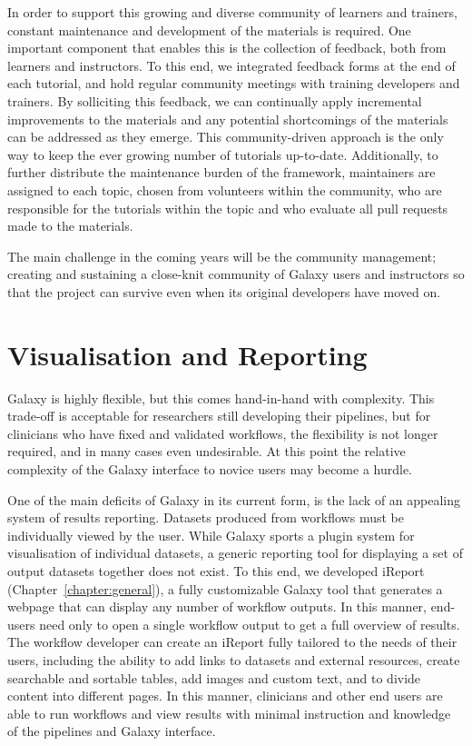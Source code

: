 In order to support this growing and diverse community of learners and trainers, constant maintenance and development of the materials is required. One important component that enables this is the collection of feedback, both from learners and instructors. To this end, we integrated feedback forms at the end of each tutorial, and hold regular community meetings with training developers and trainers. By solliciting this feedback, we can continually apply incremental improvements to the materials and any potential shortcomings of the materials can be addressed as they emerge. This community-driven approach is the only way to keep the ever growing number of tutorials up-to-date. Additionally, to further distribute the maintenance burden of the framework, maintainers are assigned to each topic, chosen from volunteers within the community, who are responsible for the tutorials within the topic and who evaluate all pull requests made to the materials.

The main challenge in the coming years will be the community management; creating and sustaining a close-knit community of Galaxy users and instructors so that the project can survive even when its original developers have moved on.


\section{Visualisation and Reporting}

Galaxy is highly flexible, but this comes hand-in-hand with complexity. This trade-off is acceptable for researchers still developing their pipelines, but for clinicians who have fixed and validated workflows, the flexibility is not longer required, and in many cases even undesirable. At this point the relative complexity of the Galaxy interface to novice users may become a hurdle.

One of the main deficits of Galaxy in its current form, is the lack of an appealing system of results reporting. Datasets produced from workflows must be individually viewed by the user. While Galaxy sports a plugin system for visualisation of individual datasets, a generic reporting tool for displaying a set of output datasets together does not exist. To this end, we developed iReport (Chapter~\ref{chapter:general}), a fully customizable Galaxy tool that generates a webpage that can display any number of workflow outputs. In this manner, end-users need only to open a single workflow output to get a full overview of results. The workflow developer can create an iReport fully tailored to the needs of their users, including the ability to add links to datasets and external resources, create searchable and sortable tables, add images and custom text, and to divide content into different pages. In this manner, clinicians and other end users are able to run workflows and view results with minimal instruction and knowledge of the pipelines and Galaxy interface.

